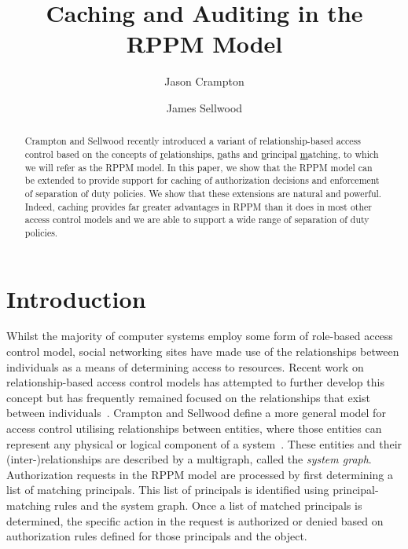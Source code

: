 \documentclass{article}
\begin{document}
\title{Caching and Auditing in the RPPM Model}

\author{Jason Crampton}
\author{James Sellwood}

\maketitle
\begin{abstract}
    Crampton and Sellwood recently introduced a variant of relationship-based access control based on the concepts of \underline{r}elationships, \underline{p}aths and \underline{p}rincipal \underline{m}atching, to which we will refer as the RPPM model.
    In this paper, we show that the RPPM model can be extended to provide support for caching of authorization decisions and enforcement of separation of duty policies.
    We show that these extensions are natural and powerful.
    Indeed, caching provides far greater advantages in RPPM than it does in most other access control models and we are able to support a wide range of separation of duty policies.
\end{abstract}

\section{Introduction}
Whilst the majority of computer systems employ some form of role-based access control model, social networking sites have made use of the relationships between individuals as a means of determining access to resources.
Recent work on relationship-based access control models has attempted to further develop this concept but has frequently remained focused on the relationships that exist between individuals~\cite{CarminatiFP09,Fong11}.
Crampton and Sellwood define a more general model for access control utilising relationships between entities, where those entities can represent any physical or logical component of a system~\cite{CramptonS14}.
These entities and their (inter-)relationships are described by a multigraph, called the \emph{system graph}.
Authorization requests in the RPPM model are processed by first determining a list of matching principals.
This list of principals is identified using principal-matching rules and the system graph.
Once a list of matched principals is determined, the specific action in the request is authorized or denied based on authorization rules defined for those principals and the object.
\end{document}
